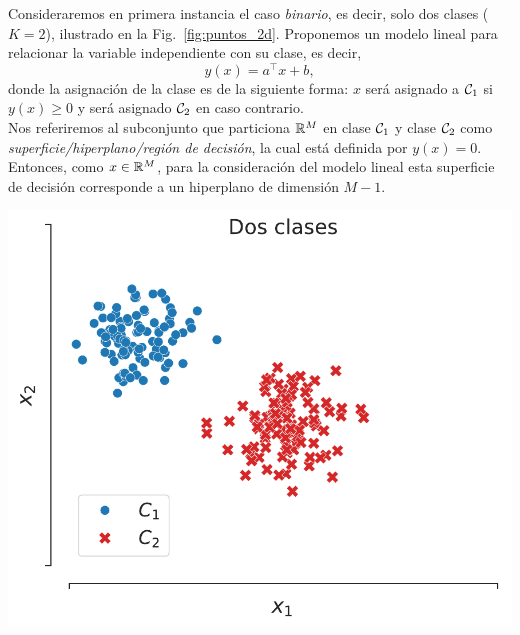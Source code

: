 \noindent\begin{minipage}{0.52\textwidth}

	  Consideraremos en primera instancia el caso \emph{binario}, es decir, solo dos clases ($K=2$), ilustrado en la Fig.~\ref{fig:puntos_2d}. Proponemos un modelo lineal para relacionar la variable independiente con su clase, es decir, 
	\begin{equation}
		y(x) = a^\top  x + b,
		\label{eq:clasificacion_lineal}
	\end{equation}
	donde la  asignación de la clase es de la siguiente forma: $x$ será asignado a ${\mathcal C}_1$ si $y(x) \geq 0$ y será asignado ${\mathcal C}_2$ en caso contrario.\\
	
	Nos referiremos al subconjunto que particiona $\mathbb{R}^M$ en clase ${\mathcal C}_1$ y clase ${\mathcal C}_2$ como \emph{superficie/hiperplano/región de decisión}, la cual está definida por $y(x)=0$. Entonces, como $x\in\mathbb{R}^M$, para la consideración del modelo lineal esta superficie de decisión corresponde a un hiperplano de dimensión $M-1$.
\end{minipage}\hfill
\begin{minipage}{0.46\textwidth}
	\centering
	\includegraphics[width=\textwidth]{img/cap3_dosclases}\\
	\label{fig:puntos_2d}
\end{minipage}

